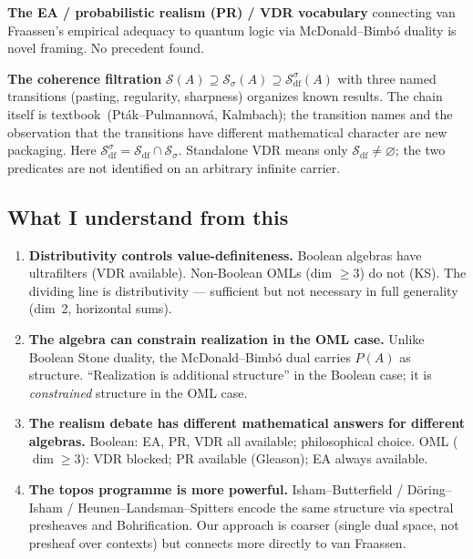 \textbf{The EA / probabilistic realism (PR) / VDR vocabulary}
connecting van Fraassen's empirical adequacy to quantum logic via
McDonald--Bimb\'{o} duality is novel framing.  No precedent found.

\textbf{The coherence filtration}
$\mathcal{S}(A) \supseteq \mathcal{S}_\sigma(A) \supseteq
\mathcal{S}_{\mathrm{df}}^\sigma(A)$ with three named transitions
(pasting, regularity, sharpness) organizes known results.  The
chain itself is textbook~(Pt\'{a}k--Pulmannov\'{a},
Kalmbach); the transition names and the observation that
the transitions have different mathematical character are new packaging.
Here $\mathcal{S}_{\mathrm{df}}^\sigma=\mathcal{S}_{\mathrm{df}}
\cap\mathcal{S}_\sigma$. Standalone VDR means only
$\mathcal{S}_{\mathrm{df}}\ne\varnothing$; the two predicates are not
identified on an arbitrary infinite carrier.

\subsection{What I understand from this}

\begin{enumerate}
  \item \textbf{Distributivity controls value-definiteness.}
    Boolean algebras have ultrafilters (VDR available).
    Non-Boolean OMLs (dim $\geq 3$) do not (KS).  The dividing
    line is distributivity --- sufficient but not necessary in
    full generality (dim~2, horizontal sums).

  \item \textbf{The algebra can constrain realization in the OML
    case.} Unlike Boolean Stone duality, the McDonald--Bimb\'{o}
    dual carries $P(A)$ as structure.  ``Realization is additional
    structure'' in the Boolean case; it is \emph{constrained}
    structure in the OML case.

  \item \textbf{The realism debate has different mathematical
    answers for different algebras.}  Boolean: EA, PR, VDR all
    available; philosophical choice.  OML ($\dim \geq 3$): VDR
    blocked; PR available (Gleason); EA always available.

  \item \textbf{The topos programme is more powerful.}
    Isham--Butterfield / D\"{o}ring--Isham / Heunen--Landsman--Spitters
    encode the same structure via spectral presheaves and
    Bohrification.  Our approach is coarser (single dual space,
    not presheaf over contexts) but connects more directly to
    van Fraassen.
\end{enumerate}

